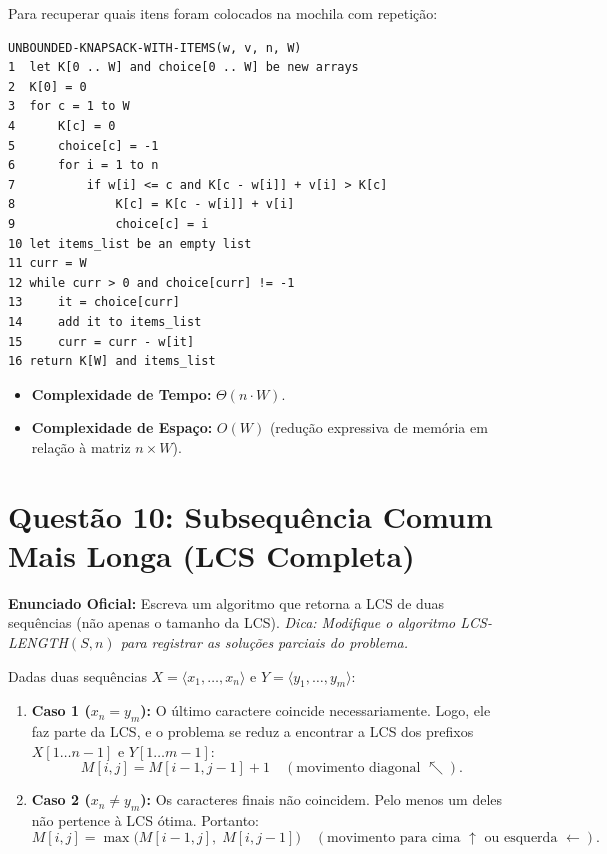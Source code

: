\documentclass[11pt,a4paper]{article}
\begin{document}
\begin{dica}
Para recuperar quais itens foram colocados na mochila com repetição:
\begin{lstlisting}
UNBOUNDED-KNAPSACK-WITH-ITEMS(w, v, n, W)
1  let K[0 .. W] and choice[0 .. W] be new arrays
2  K[0] = 0
3  for c = 1 to W
4      K[c] = 0
5      choice[c] = -1
6      for i = 1 to n
7          if w[i] <= c and K[c - w[i]] + v[i] > K[c]
8              K[c] = K[c - w[i]] + v[i]
9              choice[c] = i
10 let items_list be an empty list
11 curr = W
12 while curr > 0 and choice[curr] != -1
13     it = choice[curr]
14     add it to items_list
15     curr = curr - w[it]
16 return K[W] and items_list
\end{lstlisting}
\begin{itemize}
    \item \textbf{Complexidade de Tempo:} $\Theta(n \cdot W)$.
    \item \textbf{Complexidade de Espaço:} $O(W)$ (redução expressiva de memória em relação à matriz $n \times W$).
\end{itemize}
\end{dica}

\vspace{0.4cm}

\section*{Questão 10: Subsequência Comum Mais Longa (LCS Completa)}

\textbf{Enunciado Oficial:} Escreva um algoritmo que retorna a LCS de duas sequências (não apenas o tamanho da LCS). \emph{Dica: Modifique o algoritmo \textsc{LCS-LENGTH}$(S, n)$ para registrar as soluções parciais do problema.}

\begin{teoria}
Dadas duas sequências $X = \langle x_1, \dots, x_n \rangle$ e $Y = \langle y_1, \dots, y_m \rangle$:
\begin{enumerate}
    \item \textbf{Caso 1 ($x_n = y_m$):} O último caractere coincide necessariamente. Logo, ele faz parte da LCS, e o problema se reduz a encontrar a LCS dos prefixos $X[1 \dots n-1]$ e $Y[1 \dots m-1]$:
    \[
    M[i, j] = M[i-1, j-1] + 1 \quad (\text{movimento diagonal } \nwarrow).
    \]
    \item \textbf{Caso 2 ($x_n \ne y_m$):} Os caracteres finais não coincidem. Pelo menos um deles não pertence à LCS ótima. Portanto:
    \[
    M[i, j] = \max\Big( M[i-1, j], \; M[i, j-1] \Big) \quad (\text{movimento para cima } \uparrow \text{ ou esquerda } \leftarrow).
    \]
\end{enumerate}
\end{teoria}
\end{document}
